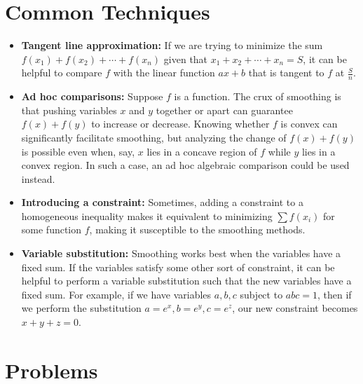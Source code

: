 \documentclass[11pt]{article}
\begin{document}
\section{Common Techniques}
\begin{itemize}
  \item \textbf{Tangent line approximation:} If we are trying to minimize the sum $f(x_1) + f(x_2) + \cdots + f(x_n)$ given that $x_1 + x_2 + \cdots + x_n = S$, it can be helpful to compare $f$ with the linear function $ax + b$ that is tangent to $f$ at $\frac{S}{n}$.  
  \item \textbf{Ad hoc comparisons:} Suppose $f$ is a function. The crux of smoothing is that pushing variables $x$ and $y$ together or apart can guarantee $f(x) + f(y)$ to increase or decrease. Knowing whether $f$ is convex can significantly facilitate smoothing, but analyzing the change of $f(x) + f(y)$ is possible even when, say, $x$ lies in a concave region of $f$ while $y$ lies in a convex region. In such a case, an ad hoc algebraic comparison could be used instead. 
  \item \textbf{Introducing a constraint:} Sometimes, adding a constraint to a homogeneous inequality makes it equivalent to minimizing $\sum f(x_i)$ for some function $f$, making it susceptible to the smoothing methods. 
  \item \textbf{Variable substitution:} Smoothing works best when the variables have a fixed sum. If the variables satisfy some other sort of constraint, it can be helpful to perform a variable substitution such that the new variables have a fixed sum. For example, if we have variables $a,b,c$ subject to $abc = 1$, then if we perform the substitution $a = e^x, b = e^y, c = e^z$, our new constraint becomes $x+y+z=0$. 
\end{itemize}

\section{Problems}
\end{document}
